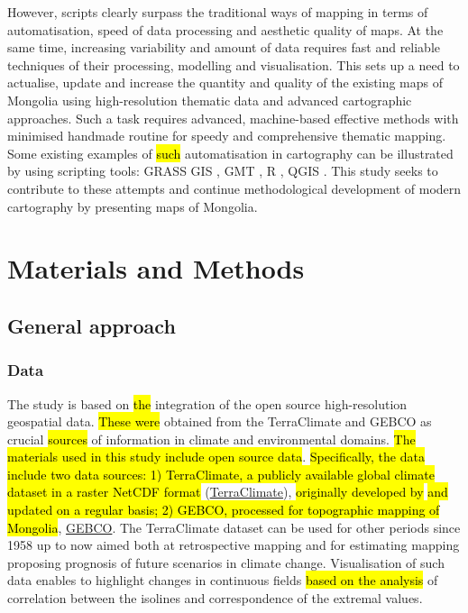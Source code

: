 \documentclass[geosciences,article,submit,pdftex,moreauthors]{Definitions/mdpi}
\begin{document}
However, scripts clearly surpass the traditional ways of mapping in terms of automatisation, speed of data processing and aesthetic quality of maps. At the same time, increasing variability and amount of data requires fast and reliable techniques of their processing, modelling and visualisation. This sets up a need to actualise, update and increase the quantity and quality of the existing maps of Mongolia using high-resolution thematic data and advanced cartographic approaches. Such a task requires advanced, machine-based effective methods with minimised handmade routine for speedy and comprehensive thematic mapping. Some existing examples of \hl{such} automatisation in cartography can be illustrated by using scripting tools: GRASS GIS \cite{FRIGERI20111265,Lemenkova2020f}, GMT \cite{5369602,Lemenkova2021g,BECKER20051075,Lemenkova2021h,OKUBO200459}, R \cite{Tserenpurev,Lemenkova2019b}, QGIS \cite{FANG202031,Lemenkova2020i}. This study seeks to contribute to these attempts and continue methodological development of modern cartography by presenting maps of Mongolia.

\section{Materials and Methods}

\subsection{General approach}

\subsubsection{Data}
The study is based on \hl{the} integration of the open source high-resolution geospatial data. \hl{These were} obtained from the TerraClimate and GEBCO as crucial \hl{sources} of information in climate and environmental domains. \hl{The materials used in this study include open source data}. \hl{Specifically, the data include two data sources: 1) TerraClimate, a publicly available global climate dataset in a raster NetCDF format} (\href{https://climate.northwestknowledge.net/TERRACLIMATE/index_directDownloads.php}{TerraClimate}), \hl{originally developed by} \cite{Abatzoglou} \hl{and updated on a regular basis; 2) GEBCO, processed for topographic mapping of Mongolia}, \href{https://www.gebco.net/data_and_products/gridded_bathymetry_data/}{GEBCO}. The TerraClimate dataset can be used for other periods since 1958 up to now aimed both at retrospective mapping and for estimating mapping proposing prognosis of future scenarios in climate change. Visualisation of such data enables to highlight changes in continuous fields \hl{based on the analysis} of correlation between the isolines and correspondence of the extremal values. 
\end{document}
